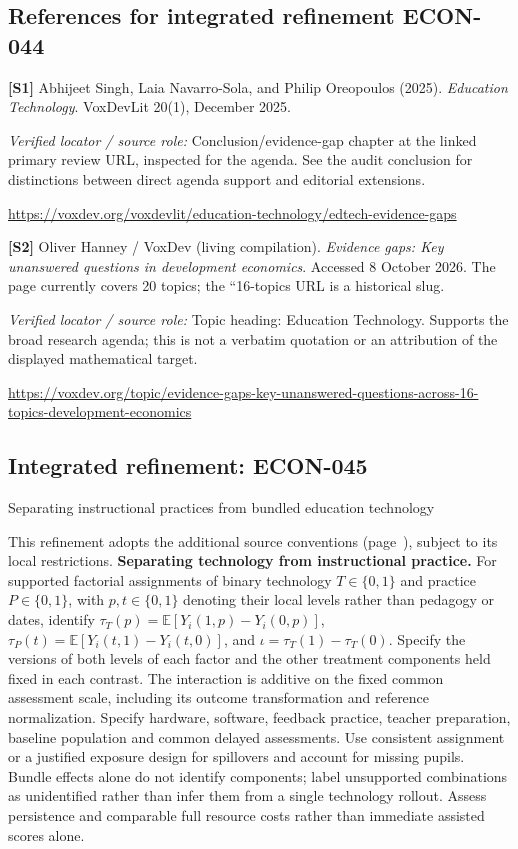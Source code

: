 \documentclass[11pt,a4paper]{article}
\begin{document}
\subsection*{References for integrated refinement ECON-044}
{\footnotesize\raggedright
\par\noindent\textbf{[S1]} Abhijeet Singh, Laia Navarro-Sola, and Philip Oreopoulos (2025). \emph{Education Technology}. VoxDevLit 20(1), December 2025.\par \textit{Verified locator / source role:} Conclusion/evidence-gap chapter at the linked primary review URL, inspected for the agenda. See the audit conclusion for distinctions between direct agenda support and editorial extensions.\par \url{https://voxdev.org/voxdevlit/education-technology/edtech-evidence-gaps}\par\smallskip
\par\noindent\textbf{[S2]} Oliver Hanney / VoxDev (living compilation). \emph{Evidence gaps: Key unanswered questions in development economics}. Accessed 8 October 2026. The page currently covers 20 topics; the ``16-topics URL is a historical slug.\par \textit{Verified locator / source role:} Topic heading: Education Technology. Supports the broad research agenda; this is not a verbatim quotation or an attribution of the displayed mathematical target.\par \url{https://voxdev.org/topic/evidence-gaps-key-unanswered-questions-across-16-topics-development-economics}\par\smallskip
}

\subsection*{Integrated refinement: ECON-045}
{\sffamily\small\color{muted}Separating instructional practices from bundled education technology\par}
This refinement adopts the additional source conventions
(page~\pageref{audited:conventions}), subject to its local restrictions.
\textbf{Separating technology from instructional practice.}
For supported factorial assignments of binary technology $T\in\{0,1\}$ and practice $P\in\{0,1\}$, with $p,t\in\{0,1\}$ denoting their local levels rather than pedagogy or dates,
identify $\tau_T(p)=\mathbb E[Y_i(1,p)-Y_i(0,p)]$,
$\tau_P(t)=\mathbb E[Y_i(t,1)-Y_i(t,0)]$, and
$\iota=\tau_T(1)-\tau_T(0)$. Specify the versions of both levels of each factor and the other treatment components held fixed in each contrast. The interaction is additive on the fixed common assessment scale, including its outcome transformation and reference normalization. Specify hardware, software, feedback practice,
teacher preparation, baseline population and common delayed assessments.
Use consistent assignment or a justified exposure design for spillovers and
account for missing pupils. Bundle effects alone do not identify components;
label unsupported combinations as unidentified rather than infer them from a
single technology rollout. Assess persistence and comparable full resource
costs rather than immediate assisted scores alone.
\end{document}
